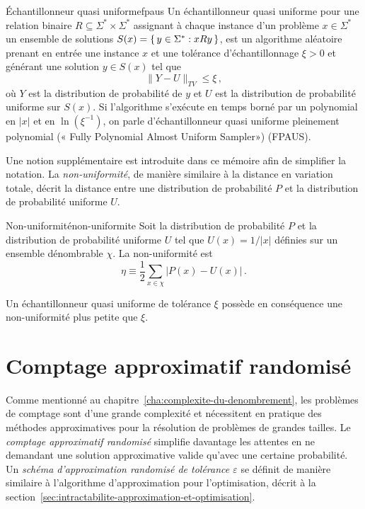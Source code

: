\begin{maindefinition}{Échantillonneur quasi uniforme}{fpaus}
    Un échantillonneur quasi uniforme pour une relation binaire $R \subseteq \Sigma^{*} \times \Sigma^{*}$ assignant à chaque instance d'un problème $x \in \Sigma^{*}$ un ensemble de solutions $S(x) = \set{ y \in \Sigma^{*} : xRy }$, est un algorithme aléatoire prenant en entrée une instance $x$ et une tolérance d'échantillonnage $\xi > 0$ et générant une solution $y \in S(x)$ tel que
    \begin{equation*}
        \lVert Y - U \rVert_{TV} \leq \xi \,,
    \end{equation*}
    où $Y$ est la distribution de probabilité de $y$ et $U$ est la distribution de probabilité uniforme sur $S(x)$. Si l'algorithme s'exécute en temps borné par un polynomial en $\lvert x \rvert$ et en $\ln (\xi^{-1})$, on parle d'échantillonneur quasi uniforme pleinement polynomial (« Fully Polynomial Almost Uniform Sampler») (FPAUS).
\end{maindefinition}

 Une notion supplémentaire est introduite dans ce mémoire afin de simplifier la notation. La \textit{non-uniformité}, de manière similaire à la distance en variation totale, décrit la distance entre une distribution de probabilité $P$ et la distribution de probabilité uniforme $U$.

\begin{maindefinition}{Non-uniformité}{non-uniformite}
    Soit la distribution de probabilité $P$ et la distribution de probabilité uniforme $U$ tel que $U(x) = 1/\lvert x \rvert$ définies sur un ensemble dénombrable $\chi$. La non-uniformité est
    \begin{equation*}
        \eta \equiv \frac{1}{2} \sum_{x \in \chi} \lvert P(x) - U(x) \rvert \,. 
    \end{equation*}
\end{maindefinition}

Un échantillonneur quasi uniforme de tolérance $\xi$ possède en conséquence une non-uniformité plus petite que $\xi$.


\section{Comptage approximatif randomisé}
\label{sec:comptage-approximatif-randomise}

Comme mentionné au chapitre~\ref{cha:complexite-du-denombrement}, les problèmes de comptage sont d'une grande complexité et nécessitent en pratique des méthodes approximatives pour la résolution de problèmes de grandes tailles. Le \textit{comptage approximatif randomisé} simplifie davantage les attentes en ne demandant une solution approximative valide qu'avec une certaine probabilité. Un \textit{schéma d'approximation randomisé de tolérance $\varepsilon$} se définit de manière similaire à l'algorithme d'approximation pour l'optimisation, décrit à la section~\ref{sec:intractabilite-approximation-et-optimisation}. 

